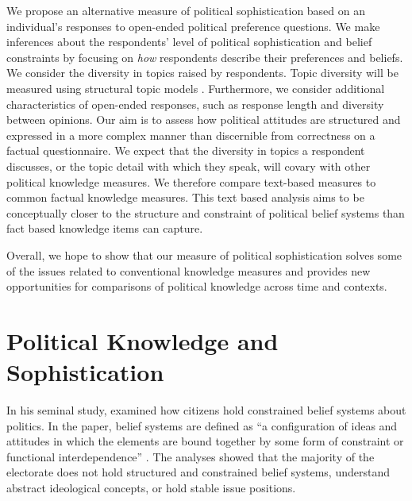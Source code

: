 \documentclass[12pt]{article}
\begin{document}
We propose an alternative measure of political sophistication based on an individual's responses to open-ended political preference questions. We make inferences about the respondents' level of political sophistication and belief constraints by focusing on 
\textit{how} respondents describe their preferences and beliefs. We consider the diversity in topics raised by respondents. Topic diversity will be measured using structural topic models 
\citep{roberts2014structural}. Furthermore, we consider additional characteristics of open-ended responses, such as response length and diversity between opinions. Our aim is to assess how political attitudes are structured and expressed in a more complex manner than discernible from correctness on a factual questionnaire. We expect that the diversity in topics a respondent discusses, or the topic detail with which they speak, will covary with other political knowledge measures. We therefore compare text-based measures to common factual knowledge measures. This text based analysis aims to be conceptually closer to the structure and constraint of political belief systems 
\citep[see for example][]{tetlock1983cognitive,luskin1987measuring} than fact based knowledge items can capture.

Overall, we hope to show that our measure of political sophistication solves some of the issues related to conventional knowledge measures and provides new opportunities for comparisons of political knowledge across time and contexts.


\section{Political Knowledge and Sophistication}

In his seminal study, \citet{converse1964nature} examined how citizens hold constrained belief systems about politics. In the paper, belief systems are defined as ``a configuration of ideas and attitudes in which the elements are bound together by some form of constraint or functional interdependence'' \citep[207]{converse1964nature}. The analyses showed that the majority of the electorate does not hold structured and constrained belief systems, understand abstract ideological concepts, or hold stable issue positions. 
\end{document}
